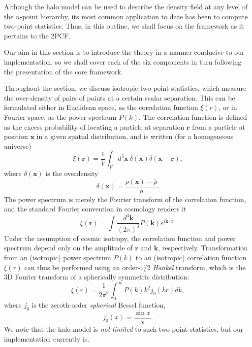 \documentclass[5p,aas_macros]{elsarticle}
\begin{document}
Although the halo model can be used to describe the density field at any level of the $n$-point hierarchy, its most common application to date has been to compute two-point statistics. Thus, in this outline, we shall focus on the framework as it pertains to the 2PCF.

Our aim in this section is to introduce the theory in a manner conducive to our implementation, so we shall cover each of the six components in turn following the presentation of the core framework.


Throughout the section, we discuss isotropic two-point statistics, which measure the over-density of pairs of points at a certain scalar separation. This can be formulated either in Euclidean space, as the correlation function $\xi(r)$, or in Fourier-space, as the power spectrum $P(k)$. 
The correlation function is defined as the excess probability of locating a particle at separation $\mathbf{r}$ from a particle at position $\mathbf{x}$ in a given spatial distribution, and is written (for a homogeneous universe)
\begin{equation}
    \xi(\mathbf{r}) = \frac{1}{V}\int_V d^3\mathbf{x}\ \delta(\mathbf{x}) \delta(\mathbf{x} - \mathbf{r}),
\end{equation}
where $\delta(\mathbf{x})$ is the overdensity
\begin{equation}
    \delta(\mathbf{x}) = \frac{\rho(\mathbf{x}) - \bar{\rho}}{\bar{\rho}}.
\end{equation}
The power spectrum is merely the Fourier transform of the correlation function, and the standard Fourier convention in cosmology renders it
\begin{equation}
    \xi(\mathbf{r}) = \int \frac{d^3 \mathbf{k}}{(2\pi)^3} P(\mathbf{k}) e^{i \mathbf{k}\cdot \mathbf{r}}.
\end{equation}
Under the assumption of cosmic isotropy, the correlation function and power spectrum depend only on the amplitude of $\mathbf{r}$ and $\mathbf{k}$, respectively. Transformation from an (isotropic) power spectrum $P(k)$ to an (isotropic) correlation function $\xi(r)$ can thus be performed using an order-$1/2$ \textit{Hankel} transform, which is the 3D Fourier transform of a spherically symmetric distribution:
\begin{equation}
\label{eq:hankel}
\xi(r) = \frac{1}{2\pi^2}\int_0^\infty P(k)k^2 j_0(kr)dk,
\end{equation}
where $j_0$ is the zeroth-order \textit{spherical} Bessel function,
\begin{equation}
    j_0(x) = \frac{\sin x}{x}.
\end{equation}
We note that the halo model is \textit{not limited} to such two-point statistics, but our implementation currently is.
\end{document}
